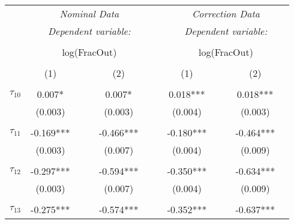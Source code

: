 % 


\begin{tabular}{@{\extracolsep{-2pt}}lccccccccccc} 
\\[-1.8ex]\hline 
\\[-1.8ex]\hline 
 & \multicolumn{5}{c}{\textit{Nominal Data}} && \multicolumn{5}{c}{\textit{Correction Data}} \\ 
\cline{2-6} \cline{8-12} 
 & \multicolumn{5}{c}{\textit{Dependent variable:}} && \multicolumn{5}{c}{\textit{Dependent variable:}} \\ 
\\[-1.8ex] & \multicolumn{5}{c}{log(FracOut)} && \multicolumn{5}{c}{log(FracOut)} \\[.5ex] 
\\[-1.8ex] & (1) && \multicolumn{3}{c}{(2)}   && (1) && \multicolumn{3}{c}{(2)}   \\ 
\cline{2-2}\cline{4-6}\cline{8-8} \cline{10-12}
\\[-2.1ex]
$\tau_{10}$ &  0.007*   &&      &  0.007*   &          && 0.018***  &&      & 0.018***  &            \\
            &  (0.003)  &&      &  (0.003)  &          &&  (0.004)  &&      &  (0.003)  &            \\
            &           &&      &           &          &&           &&      &           &            \\[-2.1ex]
$\tau_{11}$ & -0.169*** &&      & -0.466*** &          && -0.180*** &&      & -0.464*** &            \\
            &  (0.003)  &&      &  (0.007)  &          &&  (0.004)  &&      &  (0.009)  &            \\
            &           &&      &           &          &&           &&      &           &            \\[-2.1ex]
$\tau_{12}$ & -0.297*** &&      & -0.594*** &          && -0.350*** &&      & -0.634*** &            \\
            &  (0.003)  &&      &  (0.007)  &          &&  (0.004)  &&      &  (0.009)  &            \\
            &           &&      &           &          &&           &&      &           &            \\[-2.1ex]
$\tau_{13}$ & -0.275*** &&      & -0.574*** &          && -0.352*** &&      & -0.637*** &            \\

\end{tabular}
